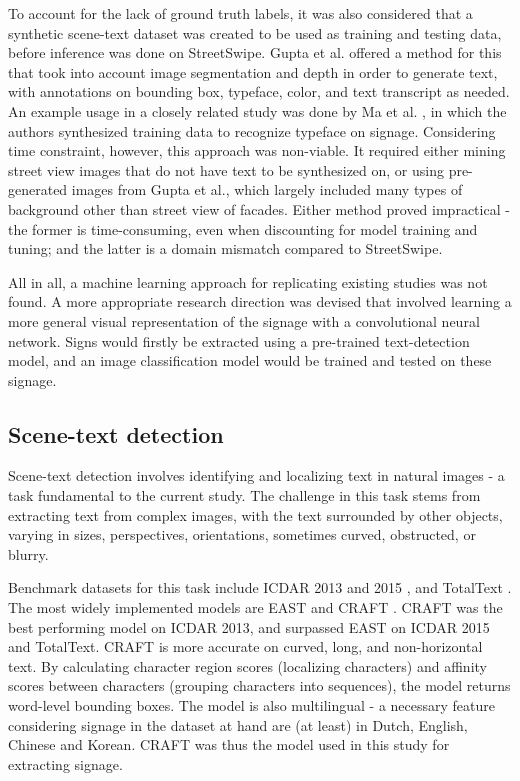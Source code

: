 To account for the lack of ground truth labels, it was also considered that a synthetic scene-text dataset was created to be used as training and testing data, before inference was done on StreetSwipe. Gupta et al. \cite{gupta_synt_2016} offered a method for this that took into account image segmentation and depth in order to generate text, with annotations on bounding box, typeface, color, and text transcript as needed. An example usage in a closely related study was done by Ma et al. \cite{ma_typef_2019}, in which the authors synthesized training data to recognize typeface on signage. Considering time constraint, however, this approach was non-viable. It required either mining street view images that do not have text to be synthesized on, or using pre-generated images from Gupta et al., which largely included many types of background other than street view of facades. Either method proved impractical - the former is time-consuming, even when discounting for model training and tuning; and the latter is a domain mismatch compared to StreetSwipe.

All in all, a machine learning approach for replicating existing studies was not found. A more appropriate research direction was devised that involved learning a more general visual representation of the signage with a convolutional neural network. Signs would firstly be extracted using a pre-trained text-detection model, and an image classification model would be trained and tested on these signage.

\subsection{Scene-text detection}
Scene-text detection involves identifying and localizing text in natural images - a task fundamental to the current study. The challenge in this task stems from extracting text from complex images, with the text surrounded by other objects, varying in sizes, perspectives, orientations, sometimes curved, obstructed, or blurry.

Benchmark datasets for this task include ICDAR 2013 \cite{icdar13} and 2015 \cite{icdar15}, and TotalText \cite{totaltext}. The most widely implemented models are EAST \cite{zhou_east_2017} and CRAFT \cite{baek_character_2019}. CRAFT was the best performing model on ICDAR 2013, and surpassed EAST on ICDAR 2015 and TotalText. CRAFT is more accurate on curved, long, and non-horizontal text. By calculating character region scores (localizing characters) and affinity scores between characters (grouping characters into sequences), the model returns word-level bounding boxes. The model is also multilingual - a necessary feature considering signage in the dataset at hand are (at least) in Dutch, English, Chinese and Korean. CRAFT was thus the model used in this study for extracting signage.

